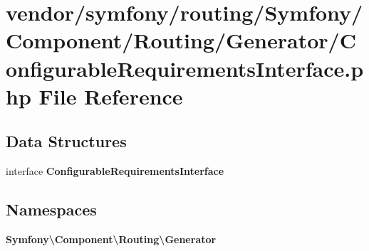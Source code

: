 \section{vendor/symfony/routing/\+Symfony/\+Component/\+Routing/\+Generator/\+Configurable\+Requirements\+Interface.php File Reference}
\label{_configurable_requirements_interface_8php}
\subsection*{Data Structures}
\begin{DoxyCompactItemize}
\item 
interface {\bf Configurable\+Requirements\+Interface}
\end{DoxyCompactItemize}
\subsection*{Namespaces}
\begin{DoxyCompactItemize}
\item 
 {\bf Symfony\textbackslash{}\+Component\textbackslash{}\+Routing\textbackslash{}\+Generator}
\end{DoxyCompactItemize}

